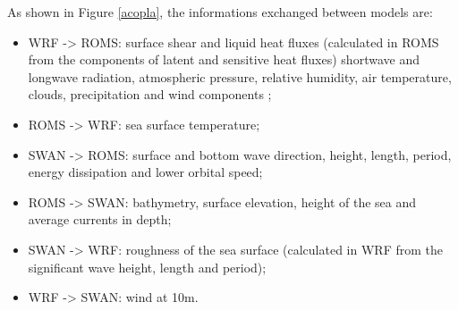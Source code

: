 \noindent As shown in Figure \textcolor{bleu_cite}{\ref{acopla}}, the informations exchanged between models are:
\bigskip

\begin{itemize}
\item WRF -> ROMS: surface shear and liquid heat fluxes (calculated in ROMS from the components of latent and sensitive heat fluxes) shortwave and longwave radiation, atmospheric pressure, relative humidity, air temperature, clouds, precipitation and wind components ;
\item ROMS -> WRF: sea surface temperature;
\item SWAN -> ROMS: surface and bottom wave direction, height, length, period, energy dissipation and lower orbital speed;
\item ROMS -> SWAN: bathymetry, surface elevation, height of the sea and average currents in depth;
\item SWAN -> WRF: roughness of the sea surface (calculated in WRF from the significant wave height, length and period);
\item WRF -> SWAN: wind at 10m.
\end{itemize}
\bigskip

